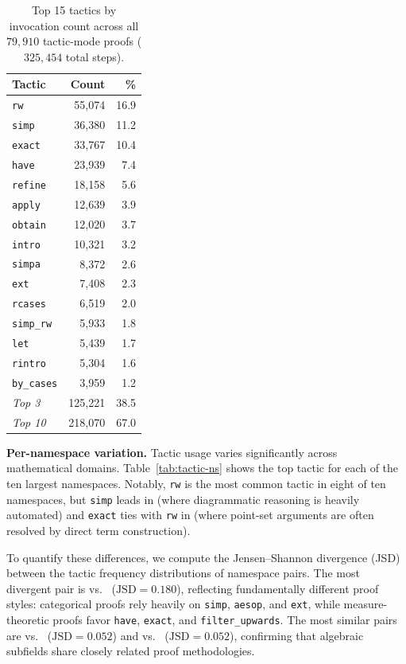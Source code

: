 \begin{table}[ht]
\centering
\small
\caption{Top 15 tactics by invocation count across all $79{,}910$ tactic-mode proofs ($325{,}454$ total steps).}
\label{tab:tactic-freq}
\begin{tabular}{l r r}
\toprule
\textbf{Tactic} & \textbf{Count} & \textbf{\%} \\
\midrule
\texttt{rw}       & 55,074 & 16.9 \\
\texttt{simp}     & 36,380 & 11.2 \\
\texttt{exact}    & 33,767 & 10.4 \\
\texttt{have}     & 23,939 &  7.4 \\
\texttt{refine}   & 18,158 &  5.6 \\
\texttt{apply}    & 12,639 &  3.9 \\
\texttt{obtain}   & 12,020 &  3.7 \\
\texttt{intro}    & 10,321 &  3.2 \\
\texttt{simpa}    &  8,372 &  2.6 \\
\texttt{ext}      &  7,408 &  2.3 \\
\texttt{rcases}   &  6,519 &  2.0 \\
\texttt{simp\_rw} &  5,933 &  1.8 \\
\texttt{let}      &  5,439 &  1.7 \\
\texttt{rintro}   &  5,304 &  1.6 \\
\texttt{by\_cases} & 3,959 &  1.2 \\
\midrule
\emph{Top 3}      & 125,221 & 38.5 \\
\emph{Top 10}     & 218,070 & 67.0 \\
\bottomrule
\end{tabular}
\end{table}

\smallskip\noindent\textbf{Per-namespace variation.}
Tactic usage varies significantly across mathematical domains. Table~\ref{tab:tactic-ns} shows the top tactic for each of the ten largest namespaces. Notably, \texttt{rw} is the most common tactic in eight of ten namespaces, but \texttt{simp} leads in  (where diagrammatic reasoning is heavily automated) and \texttt{exact} ties with \texttt{rw} in  (where point-set arguments are often resolved by direct term construction).

To quantify these differences, we compute the Jensen--Shannon divergence (JSD) between the tactic frequency distributions of namespace pairs. The most divergent pair is  vs.\  ($\mathrm{JSD} = 0.180$), reflecting fundamentally different proof styles: categorical proofs rely heavily on \texttt{simp}, \texttt{aesop}, and \texttt{ext}, while measure-theoretic proofs favor \texttt{have}, \texttt{exact}, and \texttt{filter\_upwards}. The most similar pairs are  vs.\  ($\mathrm{JSD} = 0.052$) and  vs.\  ($\mathrm{JSD} = 0.052$), confirming that algebraic subfields share closely related proof methodologies.

